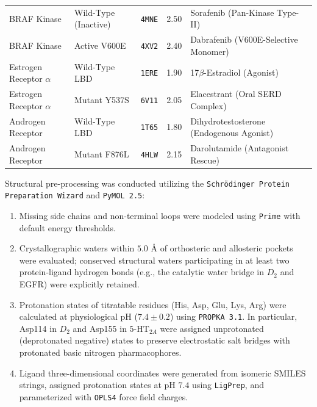 \documentclass{article}
\theoremstyle{definition}
\begin{document}
\begin{table}[!ht]
{\begin{tabular}{l l c c l}
BRAF Kinase & Wild-Type (Inactive) & \texttt{4MNE} & 2.50 & Sorafenib (Pan-Kinase Type-II) \\
BRAF Kinase & Active V600E & \texttt{4XV2} & 2.40 & Dabrafenib (V600E-Selective Monomer) \\
Estrogen Receptor $\alpha$ & Wild-Type LBD & \texttt{1ERE} & 1.90 & 17$\beta$-Estradiol (Agonist) \\
Estrogen Receptor $\alpha$ & Mutant Y537S & \texttt{6V11} & 2.05 & Elacestrant (Oral SERD Complex) \\
Androgen Receptor & Wild-Type LBD & \texttt{1T65} & 1.80 & Dihydrotestosterone (Endogenous Agonist) \\
Androgen Receptor & Mutant F876L & \texttt{4HLW} & 2.15 & Darolutamide (Antagonist Rescue) \\
\bottomrule
\end{tabular}%
}
\end{table}

Structural pre-processing was conducted utilizing the \texttt{Schr\"odinger Protein Preparation Wizard} and \texttt{PyMOL 2.5}:
\begin{enumerate}
    \item Missing side chains and non-terminal loops were modeled using \texttt{Prime} with default energy thresholds.
    \item Crystallographic waters within $5.0\text{ \AA}$ of orthosteric and allosteric pockets were evaluated; conserved structural waters participating in at least two protein-ligand hydrogen bonds (e.g., the catalytic water bridge in $D_2$ and EGFR) were explicitly retained.
    \item Protonation states of titratable residues (His, Asp, Glu, Lys, Arg) were calculated at physiological pH ($7.4 \pm 0.2$) using \texttt{PROPKA 3.1}. In particular, Asp114 in $D_2$ and Asp155 in $5\text{-HT}_{2A}$ were assigned unprotonated (deprotonated negative) states to preserve electrostatic salt bridges with protonated basic nitrogen pharmacophores.
    \item Ligand three-dimensional coordinates were generated from isomeric SMILES strings, assigned protonation states at pH $7.4$ using \texttt{LigPrep}, and parameterized with \texttt{OPLS4} force field charges.
\end{enumerate}
\end{document}
